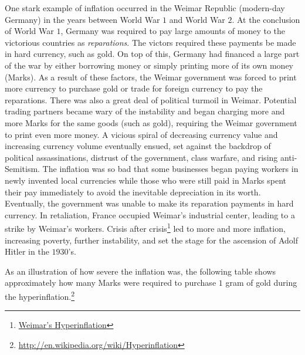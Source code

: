 \documentclass{ximera}
\begin{document}
One stark example of inflation occurred in the Weimar Republic (modern-day Germany) in the years between World War $1$ and World War $2$. At the conclusion of World War $1$, Germany was required to pay large amounts of money to the victorious countries as \emph{reparations}. The victors required these payments be made in hard currency, such as gold. On top of this, Germany had financed a large part of the war by either borrowing money or simply printing more of its own money (Marks). As a result of these factors, the Weimar government was forced to print more currency to purchase gold or trade for foreign currency to pay the reparations. There was also a great deal of political turmoil in Weimar. Potential trading partners became wary of the instability and began charging more and more Marks for the same goods (such as gold), requiring the Weimar government to print even more money. A vicious spiral of decreasing currency value and increasing currency volume eventually ensued, set against the backdrop of political assassinations, distrust of the government, class warfare, and rising anti-Semitism. The inflation was so bad that some businesses began paying workers in newly invented local currencies while those who were still paid in Marks spent their pay immediately to avoid the inevitable depreciation in its worth. Eventually, the government was unable to make its reparation payments in hard currency. In retaliation, France occupied Weimar's industrial center, leading to a strike by Weimar's workers. Crisis after crisis\footnote{\href{http://www.businessinsider.com/weimar-the-real-story-of-the-devastating-collapse-that-haunts-the-eurozone-today-2012-10?op=1}{Weimar's Hyperinflation}} led to more and more inflation, increasing poverty, further instability, and set the stage for the ascension of Adolf Hitler in the $1930$'s.

As an illustration of how severe the inflation was, the following table shows approximately how many Marks were required to purchase $1$ gram of gold during the hyperinflation.\footnote{\href{http://en.wikipedia.org/wiki/Hyperinflation}{http://en.wikipedia.org/wiki/Hyperinflation}}
\end{document}
